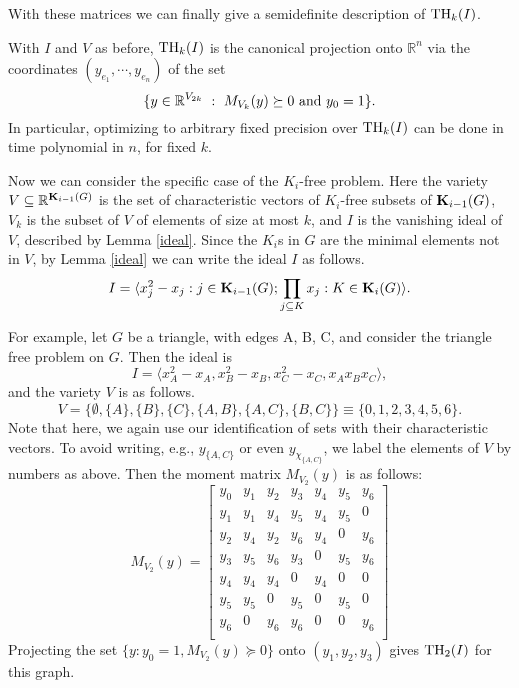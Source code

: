 With these matrices we can finally give a semidefinite description of $\textup{TH}_k(I)$.

\begin{proposition}
With $I$ and $V$ as before, $\textup{TH}_k(I)$ is the canonical projection onto $\mathbb{R}^n$ via the coordinates $(y_{e_1}, \cdots, y_{e_n})$ of the set
$$\{y \in \RR^{V_{2k}}\ : \ M_{V_k}(y) \succeq 0 \textrm{ and } y_{0}=1\}.$$
In particular, optimizing to arbitrary fixed precision over $\textup{TH}_k(I)$
can be done in time polynomial in $n$, for fixed $k$.
\end{proposition}

Now we can consider the specific case of the $K_i$-free problem. Here the variety $V \subseteq \mathbb{R}^{\mathbf{K}_{i-1}(G)}$ is the set of characteristic vectors of $K_i$-free subsets of $\mathbf{K}_{i-1}(G)$, $V_k$ is the subset of $V$ of elements of size at most $k$, and $I$ is the vanishing ideal of $V$, described by Lemma \ref{ideal}. Since the $K_i$s in $G$ are the minimal elements not in $V$, by Lemma \ref{ideal} we can write the ideal $I$ as follows.
$$I=\langle x_j^2 - x_j :j \in \mathbf{K}_{i-1}(G); \prod_{j \subseteq K}x_j: K \in \mathbf{K}_i(G)\rangle.$$

For example, let $G$ be a triangle, with edges A, B, C, and consider the triangle free problem on $G$. Then the ideal is
$$I = \langle x_A^2 - x_A, x_B^2 - x_B,  x_C^2 - x_C, x_Ax_Bx_C \rangle,$$
and the variety $V$ is as follows.
$$V = \{\emptyset,\{A\},\{B\},\{C\},\{A,B\},\{A,C\},\{B,C\}\} \equiv \{0,1,2,3,4,5,6\}.$$ 
Note that here, we again use our identification of sets with their characteristic vectors. To avoid writing, e.g., $y_{\{A,C\}}$ or even $y_{\chi_{\{A,C\}}}$, we label the elements of $V$ by numbers as above.
Then the moment matrix $M_{V_2}(y)$ is as follows:
$$M_{V_2}(y) = 
\left[
\begin{array}{ccccccc}
y_0 & y_1 & y_2 & y_3 & y_4 & y_5 & y_6 \\
y_1 & y_1 & y_4 & y_5 & y_4 & y_5 & 0 \\
y_2 & y_4 & y_2 & y_6 & y_4 & 0 & y_6 \\
y_3 & y_5 & y_6 & y_3 & 0 & y_5 & y_6 \\
y_4 & y_4 & y_4 & 0 & y_4 &0 & 0 \\
y_5& y_5 & 0 & y_5 & 0 & y_5 & 0 \\
y_6 & 0 & y_6 & y_6 & 0 & 0 & y_6 \\
\end{array}
\right]$$
Projecting the set $\{y: y_0 = 1, M_{V_2}(y) \succeq 0 \}$ onto $(y_1,y_2,y_3)$ gives $\textup{TH}_2(I)$ for this graph.

